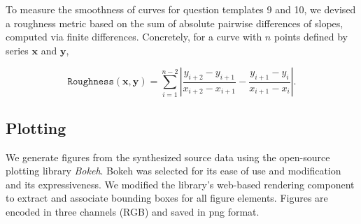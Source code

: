 \documentclass{article} %
\begin{document}
To measure the smoothness of curves for question templates 9 and 10, we devised a roughness metric based on the sum of absolute pairwise differences of slopes, computed via finite differences. Concretely, for a curve with $n$ points defined by series $\mathbf{x}$ and $\mathbf{y}$,

\[\mathtt{Roughness}(\mathbf{x},\mathbf{y})= \displaystyle\sum\limits_{i=1}^{n-2} \left\lvert \dfrac{y_{i+2} - y_{i+1}}{x_{i+2} - x_{i+1}} - \dfrac{y_{i+1} - y_{i}}{x_{i+1} - x_{i}}\right\rvert. \]

\subsection{Plotting}
We generate figures from the synthesized source data using the open-source plotting library \emph{Bokeh}. Bokeh was selected for its ease of use and modification and its expressiveness. We modified the library's web-based rendering component to extract and associate bounding boxes for all figure elements. Figures are encoded in three channels (RGB) and saved in \gls{png} format.
\end{document}
